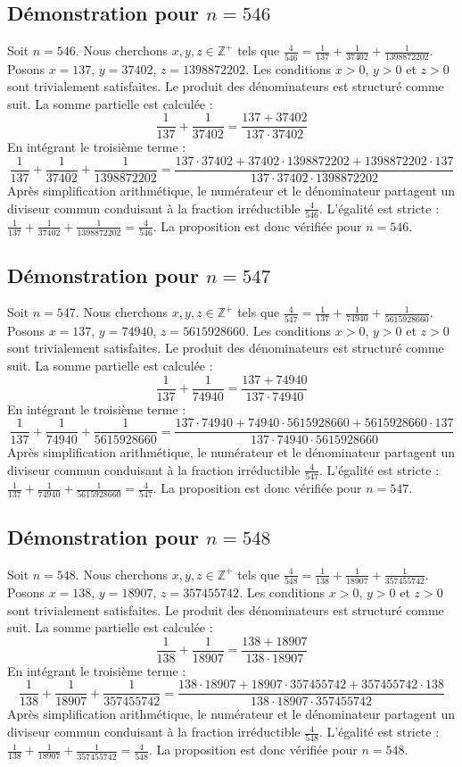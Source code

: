 \documentclass[11pt,a4paper]{article}
\begin{document}
\subsection{Démonstration pour $n = 546$}
Soit $n = 546$. Nous cherchons $x, y, z \in \mathbb{Z}^{+}$ tels que $\frac{4}{546} = \frac{1}{137} + \frac{1}{37402} + \frac{1}{1398872202}$.
Posons $x = 137$, $y = 37402$, $z = 1398872202$.
Les conditions $x > 0$, $y > 0$ et $z > 0$ sont trivialement satisfaites.
Le produit des dénominateurs est structuré comme suit. La somme partielle est calculée :
$$ \frac{1}{137} + \frac{1}{37402} = \frac{137+37402}{137 \cdot 37402} $$
En intégrant le troisième terme :
$$ \frac{1}{137} + \frac{1}{37402} + \frac{1}{1398872202} = \frac{137 \cdot 37402 + 37402 \cdot 1398872202 + 1398872202 \cdot 137}{137 \cdot 37402 \cdot 1398872202} $$
Après simplification arithmétique, le numérateur et le dénominateur partagent un diviseur commun conduisant à la fraction irréductible $\frac{4}{546}$.
L'égalité est stricte : $\frac{1}{137} + \frac{1}{37402} + \frac{1}{1398872202} = \frac{4}{546}$.
La proposition est donc vérifiée pour $n = 546$.
\subsection{Démonstration pour $n = 547$}
Soit $n = 547$. Nous cherchons $x, y, z \in \mathbb{Z}^{+}$ tels que $\frac{4}{547} = \frac{1}{137} + \frac{1}{74940} + \frac{1}{5615928660}$.
Posons $x = 137$, $y = 74940$, $z = 5615928660$.
Les conditions $x > 0$, $y > 0$ et $z > 0$ sont trivialement satisfaites.
Le produit des dénominateurs est structuré comme suit. La somme partielle est calculée :
$$ \frac{1}{137} + \frac{1}{74940} = \frac{137+74940}{137 \cdot 74940} $$
En intégrant le troisième terme :
$$ \frac{1}{137} + \frac{1}{74940} + \frac{1}{5615928660} = \frac{137 \cdot 74940 + 74940 \cdot 5615928660 + 5615928660 \cdot 137}{137 \cdot 74940 \cdot 5615928660} $$
Après simplification arithmétique, le numérateur et le dénominateur partagent un diviseur commun conduisant à la fraction irréductible $\frac{4}{547}$.
L'égalité est stricte : $\frac{1}{137} + \frac{1}{74940} + \frac{1}{5615928660} = \frac{4}{547}$.
La proposition est donc vérifiée pour $n = 547$.
\subsection{Démonstration pour $n = 548$}
Soit $n = 548$. Nous cherchons $x, y, z \in \mathbb{Z}^{+}$ tels que $\frac{4}{548} = \frac{1}{138} + \frac{1}{18907} + \frac{1}{357455742}$.
Posons $x = 138$, $y = 18907$, $z = 357455742$.
Les conditions $x > 0$, $y > 0$ et $z > 0$ sont trivialement satisfaites.
Le produit des dénominateurs est structuré comme suit. La somme partielle est calculée :
$$ \frac{1}{138} + \frac{1}{18907} = \frac{138+18907}{138 \cdot 18907} $$
En intégrant le troisième terme :
$$ \frac{1}{138} + \frac{1}{18907} + \frac{1}{357455742} = \frac{138 \cdot 18907 + 18907 \cdot 357455742 + 357455742 \cdot 138}{138 \cdot 18907 \cdot 357455742} $$
Après simplification arithmétique, le numérateur et le dénominateur partagent un diviseur commun conduisant à la fraction irréductible $\frac{4}{548}$.
L'égalité est stricte : $\frac{1}{138} + \frac{1}{18907} + \frac{1}{357455742} = \frac{4}{548}$.
La proposition est donc vérifiée pour $n = 548$.
\end{document}
